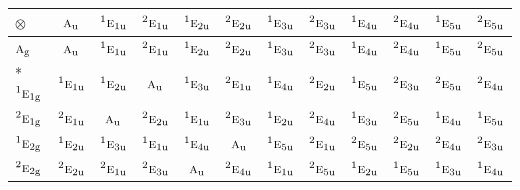\documentclass[10pt,a4paper]{article}
\numberwithin{equation}{section}
\newcommand{\irr}[1]{\text{\normalfont\scshape #1}}
\newcommand{\conjpair}[1]{{}^{#1}}
\newcommand{\ptag}[1]{\mathrm{#1}}
\newcommand{\irrprod}{\otimes}
\begin{document}
{\small\setlength{\tabcolsep}{3pt}\begin{longtable}{@{}lccccccccccc@{}}\toprule
$\irrprod$ & $\irr{a}_{\ptag{u}}$ & $\conjpair{1}\irr{e}_{1\ptag{u}}$ & $\conjpair{2}\irr{e}_{1\ptag{u}}$ & $\conjpair{1}\irr{e}_{2\ptag{u}}$ & $\conjpair{2}\irr{e}_{2\ptag{u}}$ & $\conjpair{1}\irr{e}_{3\ptag{u}}$ & $\conjpair{2}\irr{e}_{3\ptag{u}}$ & $\conjpair{1}\irr{e}_{4\ptag{u}}$ & $\conjpair{2}\irr{e}_{4\ptag{u}}$ & $\conjpair{1}\irr{e}_{5\ptag{u}}$ & $\conjpair{2}\irr{e}_{5\ptag{u}}$\\\midrule\endhead
\bottomrule\endfoot\endlastfoot
$\irr{a}_{\ptag{g}}$ & $\irr{a}_{\ptag{u}}$ & $\conjpair{1}\irr{e}_{1\ptag{u}}$ & $\conjpair{2}\irr{e}_{1\ptag{u}}$ & $\conjpair{1}\irr{e}_{2\ptag{u}}$ & $\conjpair{2}\irr{e}_{2\ptag{u}}$ & $\conjpair{1}\irr{e}_{3\ptag{u}}$ & $\conjpair{2}\irr{e}_{3\ptag{u}}$ & $\conjpair{1}\irr{e}_{4\ptag{u}}$ & $\conjpair{2}\irr{e}_{4\ptag{u}}$ & $\conjpair{1}\irr{e}_{5\ptag{u}}$ & $\conjpair{2}\irr{e}_{5\ptag{u}}$\\*
$\conjpair{1}\irr{e}_{1\ptag{g}}$ & $\conjpair{1}\irr{e}_{1\ptag{u}}$ & $\conjpair{1}\irr{e}_{2\ptag{u}}$ & $\irr{a}_{\ptag{u}}$ & $\conjpair{1}\irr{e}_{3\ptag{u}}$ & $\conjpair{2}\irr{e}_{1\ptag{u}}$ & $\conjpair{1}\irr{e}_{4\ptag{u}}$ & $\conjpair{2}\irr{e}_{2\ptag{u}}$ & $\conjpair{1}\irr{e}_{5\ptag{u}}$ & $\conjpair{2}\irr{e}_{3\ptag{u}}$ & $\conjpair{2}\irr{e}_{5\ptag{u}}$ & $\conjpair{2}\irr{e}_{4\ptag{u}}$\\
$\conjpair{2}\irr{e}_{1\ptag{g}}$ & $\conjpair{2}\irr{e}_{1\ptag{u}}$ & $\irr{a}_{\ptag{u}}$ & $\conjpair{2}\irr{e}_{2\ptag{u}}$ & $\conjpair{1}\irr{e}_{1\ptag{u}}$ & $\conjpair{2}\irr{e}_{3\ptag{u}}$ & $\conjpair{1}\irr{e}_{2\ptag{u}}$ & $\conjpair{2}\irr{e}_{4\ptag{u}}$ & $\conjpair{1}\irr{e}_{3\ptag{u}}$ & $\conjpair{2}\irr{e}_{5\ptag{u}}$ & $\conjpair{1}\irr{e}_{4\ptag{u}}$ & $\conjpair{1}\irr{e}_{5\ptag{u}}$\\
$\conjpair{1}\irr{e}_{2\ptag{g}}$ & $\conjpair{1}\irr{e}_{2\ptag{u}}$ & $\conjpair{1}\irr{e}_{3\ptag{u}}$ & $\conjpair{1}\irr{e}_{1\ptag{u}}$ & $\conjpair{1}\irr{e}_{4\ptag{u}}$ & $\irr{a}_{\ptag{u}}$ & $\conjpair{1}\irr{e}_{5\ptag{u}}$ & $\conjpair{2}\irr{e}_{1\ptag{u}}$ & $\conjpair{2}\irr{e}_{5\ptag{u}}$ & $\conjpair{2}\irr{e}_{2\ptag{u}}$ & $\conjpair{2}\irr{e}_{4\ptag{u}}$ & $\conjpair{2}\irr{e}_{3\ptag{u}}$\\
$\conjpair{2}\irr{e}_{2\ptag{g}}$ & $\conjpair{2}\irr{e}_{2\ptag{u}}$ & $\conjpair{2}\irr{e}_{1\ptag{u}}$ & $\conjpair{2}\irr{e}_{3\ptag{u}}$ & $\irr{a}_{\ptag{u}}$ & $\conjpair{2}\irr{e}_{4\ptag{u}}$ & $\conjpair{1}\irr{e}_{1\ptag{u}}$ & $\conjpair{2}\irr{e}_{5\ptag{u}}$ & $\conjpair{1}\irr{e}_{2\ptag{u}}$ & $\conjpair{1}\irr{e}_{5\ptag{u}}$ & $\conjpair{1}\irr{e}_{3\ptag{u}}$ & $\conjpair{1}\irr{e}_{4\ptag{u}}$\\

\end{longtable}}
\end{document}
